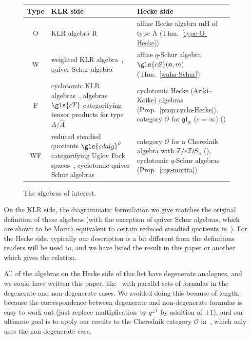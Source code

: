 \documentclass[ALCO,ThmDefs,Unicode,epreuves]{cedram}
\newcommand{\Z}{\mathbb{Z}}
\newcommand{\cO}{\mathcal{O}}
\begin{document}
\begin{figure}[htb]\label{table-of-algebras} \centering
\renewcommand{\arraystretch}{1.4}
 \begin{tabular}{|c|p{43mm}|p{68mm}|} 
 \hline
 Type& KLR side & Hecke side \\
\hline 
O&KLR algebra \gls{R}~\cite{KLI,Rou2KM}
& affine Hecke algebra \gls{mH} of type A (Thm.~\ref{type-O-Hecke})\\ 
\hline
W& weighted KLR algebra~\cite{WebwKLR}, quiver Schur algebra~\cite{SWschur} & 
affine $q$-Schur algebra $\gls{cS}(n,m)$ (Thm.~\ref{waha-Schur})\\ 
\hline
F& cyclotomic KLR algebras~\cite{KLI}, algebras $\gls{cT}$ categorifying tensor products 
for type $A/\hat{A}$~\cite{Webmerged} &
cyclotomic Hecke (Ariki--Koike) algebras (Prop.~\ref{prop:cyclo-Hecke}), 
category $\cO$ for $\mathfrak{gl}_N$ ($e=\infty$) (\cite[9.11]{Webmerged})\\ 
\hline
WF& reduced steadied quotients $\gls{cdalg}^\vartheta$ categorifying Uglov Fock spaces~\cite{WebRou}, cyclotomic quiver Schur algebras~\cite{SWschur}&
 category $\cO$ for a
Cherednik algebra with $\Z/e\Z\wr S_n$ (\cite[Thm.~A]{WebRou}),
cyclotomic $q$-Schur algebras (Prop.~\ref{cqs-morita}) \\ 
\hline
\end{tabular}
\caption{The algebras of interest.}
\end{figure}
 
 
 
On the KLR side, the diagrammatic formulation we give matches the
original definition of these algebras (with the exception of quiver
Schur algebras, which are shown to be Morita equivalent to certain
reduced steadied quotients in~\cite[Th.~3.9]{WebwKLR}). For
the Hecke side, typically our description is a bit different from the
definitions readers will be used to, and we have
listed the result in this paper or another which gives the relation.

\begin{rema}
 All of the algebras on the Hecke side of this list have degenerate
 analogues, and we could have written this paper, like~\cite{BKKL}
 with parallel sets of formulas in the degenerate and non-degenerate
 cases. We avoided doing this because of length, because the correspondence between
 degenerate and non-degenerate formulas is easy to work out (just replace
 multiplication by $q^{\pm 1}$ by addition of $\pm 1$), and our
 ultimate goal is to apply our results to the Cherednik category
 $\cO$ in~\cite{WebRou},
 which only uses the non-degenerate case. 
\end{rema}
\end{document}

